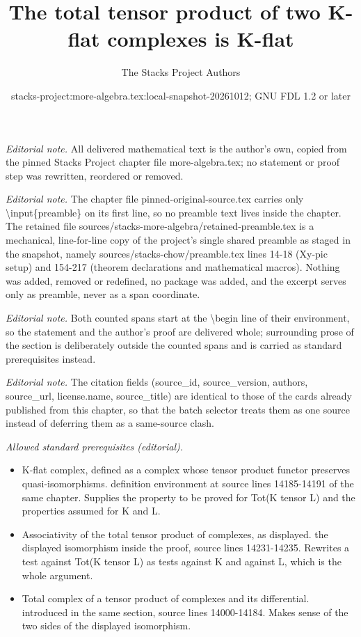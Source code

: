 \documentclass[10pt,a4paper]{amsart}
\title{The total tensor product of two K-flat complexes is K-flat}
\author{The Stacks Project Authors}
\date{stacks-project:more-algebra.tex:local-snapshot-20261012; GNU FDL 1.2 or later}
\theoremstyle{plain}
\theoremstyle{definition}
\theoremstyle{remark}
\numberwithin{equation}{subsection}
\begin{document}
\maketitle
\setcounter{subsection}{1}
\noindent\textit{Editorial note.} All delivered mathematical text is the author's own, copied from the pinned Stacks Project chapter file more-algebra.tex; no statement or proof step was rewritten, reordered or removed.\par\medskip
\noindent\textit{Editorial note.} The chapter file pinned-original-source.tex carries only \textbackslash{}input\{preamble\} on its first line, so no preamble text lives inside the chapter. The retained file sources/stacks-more-algebra/retained-preamble.tex is a mechanical, line-for-line copy of the project's single shared preamble as staged in the snapshot, namely sources/stacks-chow/preamble.tex lines 14-18 (Xy-pic setup) and 154-217 (theorem declarations and mathematical macros). Nothing was added, removed or redefined, no package was added, and the excerpt serves only as preamble, never as a span coordinate.\par\medskip
\noindent\textit{Editorial note.} Both counted spans start at the \textbackslash{}begin line of their environment, so the statement and the author's proof are delivered whole; surrounding prose of the section is deliberately outside the counted spans and is carried as standard prerequisites instead.\par\medskip
\noindent\textit{Editorial note.} The citation fields (source\_id, source\_version, authors, source\_url, license.name, source\_title) are identical to those of the cards already published from this chapter, so that the batch selector treats them as one source instead of deferring them as a same-source clash.\par\medskip
\noindent\textit{Allowed standard prerequisites (editorial).}\begin{itemize}
\item K-flat complex, defined as a complex whose tensor product functor preserves quasi-isomorphisms. definition environment at source lines 14185-14191 of the same chapter. Supplies the property to be proved for Tot(K tensor L) and the properties assumed for K and L.
\item Associativity of the total tensor product of complexes, as displayed. the displayed isomorphism inside the proof, source lines 14231-14235. Rewrites a test against Tot(K tensor L) as tests against K and against L, which is the whole argument.
\item Total complex of a tensor product of complexes and its differential. introduced in the same section, source lines 14000-14184. Makes sense of the two sides of the displayed isomorphism.
\end{itemize}\medskip
\end{document}
